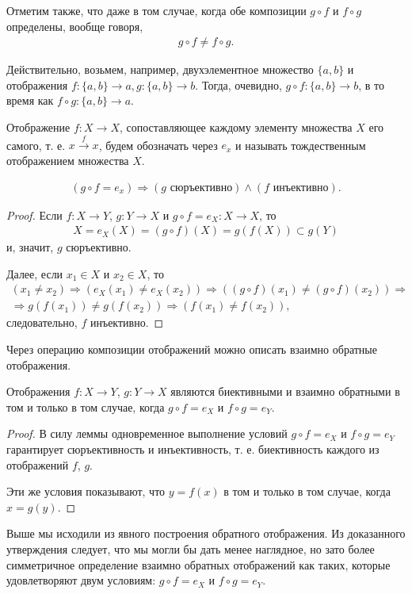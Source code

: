 \documentclass[14pt]{extreport}
\begin{document}
Отметим также, что даже в том случае, когда обе композиции $g \circ f$ и $f \circ g$
определены, вообще говоря,
\begin{eqnarray}
g \circ f \ne f \circ g.
\end{eqnarray}

Действительно, возьмем, например, двухэлементное множество $\{a, b\}$ и
отображения $f \colon \{a, b\} \to a, g \colon \{a, b\} \to b$. Тогда, очевидно, $g \circ f \colon \{a, b\} \to b$, в то время как $f \circ g \colon \{a, b\} \to a$.

Отображение $f \colon X \to X$, сопоставляющее каждому элементу множества $X$
его самого, т. е. $x \xrightarrow{f} x$, будем обозначать через $e_x$ и называть тождественным отображением множества $X$.

\begin{lemma}

\begin{eqnarray}
	(g \circ f=e_x) \Rightarrow (g \text{ сюръективно})\land(f \text{ инъективно}).
\end{eqnarray}

\begin{proof} Если $f \colon X \to Y$, $g \colon Y \to X$ и $g \circ f=e_X \colon X \to X$, то
\begin{eqnarray}
X=e_X(X)=(g \circ f)(X)=g(f(X)) \subset g(Y)
\end{eqnarray}
и, значит, $g$ сюръективно.

Далее, если $x_1 \in X$ и $x_2 \in X$, то
\begin{multline}
(x_1 \ne x_2) \Rightarrow (e_X(x_1) \ne e_X(x_2)) \Rightarrow ((g \circ f)(x_1) \ne (g \circ f)(x_2)) \Rightarrow \\
\Rightarrow g(f(x_1)) \ne g(f(x_2)) \Rightarrow (f(x_1) \ne f(x_2)),
\end{multline}
следовательно, $f$ инъективно.
\end{proof}
\end{lemma}

Через операцию композиции отображений можно описать взаимно обратные отображения.
\begin{statement}
Отображения $f \colon X \to Y$, $g \colon Y \to X$ являются биективными и взаимно обратными в том и только в том случае, когда $g \circ f=e_X$ и $f \circ g=e_Y$.
\end{statement}
\begin{proof}
В силу леммы одновременное выполнение условий $g \circ f=e_X$ и $f \circ g=e_Y$ гарантирует сюръективность и инъективность, т. е. биективность каждого
из отображений $f$, $g$.

Эти же условия показывают, что $y=f(x)$ в том и только в том случае, когда $x=g(y)$.
\end{proof}
Выше мы исходили из явного построения обратного отображения. Из доказанного утверждения следует, что мы могли бы дать менее наглядное, но
зато более симметричное определение взаимно обратных отображений как
таких, которые удовлетворяют двум условиям: $g \circ f=e_X$ и $f \circ g=e_Y$.
\end{document}
